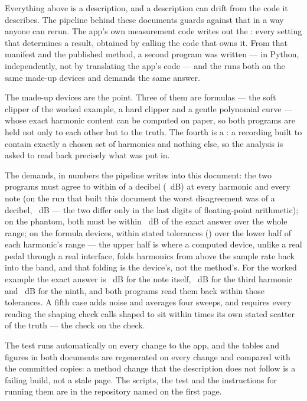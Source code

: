 \documentclass[11pt,a4paper]{article}
\begin{document}
Everything above is a description, and a description can drift from the
code it describes. The pipeline behind these documents guards against
that in a way anyone can rerun. The app's own measurement code writes out
the : every setting that determines a result, obtained by
calling the code that owns it. From that manifest and the published
method, a second program was written --- in Python, independently, not by
translating the app's code --- and the  runs both on the
same made-up devices and demands the same answer.

The made-up devices are the point. Three of them are formulas --- the
soft clipper of the worked example, a hard clipper and a gentle
polynomial curve --- whose exact harmonic content can be computed on
paper, so both programs are held not only to each other but to the truth.
The fourth is a : a recording built to contain exactly a
chosen set of harmonics and nothing else, so the analysis is asked to
read back precisely what was put in.

The demands, in numbers the pipeline writes into this document: the two
programs must agree to within \paritySwiftToleranceWords{} of a decibel
(\paritySwiftTolerance{}~dB) at every harmonic and every note (on the run
that built this document the worst disagreement was
\parityWorstSwiftWords{} of a decibel, \parityWorstSwift{}~dB --- the two
differ only in the last digits of floating-point arithmetic); on the
phantom, both must be
within \parityAliasFreeTolerance{}~dB of the exact answer over the whole
range; on the formula devices, within stated tolerances
(\parityPerSampleTolerances) over the lower half of each harmonic's range
--- the upper half is where a computed device, unlike a real pedal
through a real interface, folds harmonics from above the sample rate
back into the band, and that folding is the device's, not the method's.
For the worked example the exact answer is \parityTanhHone{}~dB for the
note itself, \parityTanhHthree{}~dB for the third harmonic and
\parityTanhHnine{}~dB for the ninth, and both programs read them back
within those tolerances. A fifth case adds noise and averages four
sweeps, and requires every reading the shaping check calls shaped to sit
within \parityScatterMultiple{} times its own stated scatter of the
truth --- the check on the check.

The test runs automatically on every change to the app, and the tables
and figures in both documents are regenerated on every change and
compared with the committed copies: a method change that the description
does not follow is a failing build, not a stale page. The scripts, the
test and the instructions for running them are in the repository named
on the first page.
\end{document}
